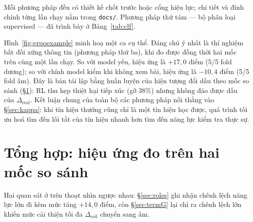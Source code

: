 \documentclass[11pt,a4paper]{article}
\newcommand{\dceil}{\Delta_{\mathrm{ceil}}}
\newcommand{\dhonest}{\Delta_{\mathrm{real}}}
\begin{document}
Mỗi phương pháp đều có thiết kế chốt trước hoặc cổng hiệu lực; chi tiết và đính chính
từng lần chạy nằm trong \texttt{docs/}. Phương pháp thứ tám --- bộ phân loại supervised
--- đã trình bày ở Bảng~\ref{tab:clf}.

Hình~\ref{fig:grpoexample} minh hoạ một ca cụ thể. Đáng chú ý nhất là thí nghiệm bất đối xứng thông tin (phương pháp thứ ba), khi đo được đồng thời hai mốc trên cùng một lần chạy. So với model yếu, hiệu ứng là $+17{,}0$ điểm (5/5 fold dương); so với chính model kiểm khi không xem bài, hiệu ứng là $-10{,}4$ điểm (5/5 fold âm). Đây là bản tái lập bằng huấn luyện của hiện tượng đổi dấu theo mốc so sánh (\S\ref{sec:synthesis}): RL thu hẹp thiệt hại tiếp xúc (gỡ 38\%) nhưng không đảo được dấu của $\dhonest$. Kết luận chung của toàn bộ các phương pháp nối thẳng vào \S\ref{sec:kappa}: khi tín hiệu thưởng cũng chỉ là một tín hiệu học được, quá trình tối ưu hoá tìm đến lối tắt của tín hiệu nhanh hơn tìm đến năng lực kiểm tra thực sự.

\section{Tổng hợp: hiệu ứng đo trên hai mốc so sánh}\label{sec:synthesis}

Hai quan sát ở trên thoạt nhìn ngược nhau: \S\ref{sec:roles} ghi nhận chênh lệch năng lực lớn
đi kèm mức tăng $+14{,}0$ điểm, còn \S\ref{sec:termG} lại chỉ ra chênh lệch lớn khiến mức cải
thiện tối đa $\dceil$ chuyển sang âm.
\end{document}
